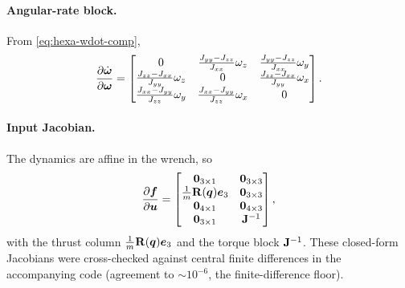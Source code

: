 \paragraph{Angular-rate block.} From \cref{eq:hexa-wdot-comp},
\begin{equation}
\frac{\partial\dot{\bm{\omega}}}{\partial\bm{\omega}}=
\begin{bmatrix}
0 & \tfrac{J_{yy}-J_{zz}}{J_{xx}}\omega_z & \tfrac{J_{yy}-J_{zz}}{J_{xx}}\omega_y\\
\tfrac{J_{zz}-J_{xx}}{J_{yy}}\omega_z & 0 & \tfrac{J_{zz}-J_{xx}}{J_{yy}}\omega_x\\
\tfrac{J_{xx}-J_{yy}}{J_{zz}}\omega_y & \tfrac{J_{xx}-J_{yy}}{J_{zz}}\omega_x & 0
\end{bmatrix}.
\end{equation}

\paragraph{Input Jacobian.} The dynamics are affine in the wrench, so
\begin{equation}
\frac{\partial\bm{f}}{\partial\bm{u}}=
\begin{bmatrix}
\mathbf{0}_{3\times1} & \mathbf{0}_{3\times3}\\
\tfrac1m\mathbf{R}(\bm{q})\bm{e}_3 & \mathbf{0}_{3\times3}\\
\mathbf{0}_{4\times1} & \mathbf{0}_{4\times3}\\
\mathbf{0}_{3\times1} & \mathbf{J}^{-1}
\end{bmatrix},
\end{equation}
with the thrust column $\tfrac1m\mathbf{R}(\bm{q})\bm{e}_3$ and the torque block
$\mathbf{J}^{-1}$. These closed-form Jacobians were cross-checked against central
finite differences in the accompanying code (agreement to $\sim10^{-6}$, the
finite-difference floor).
